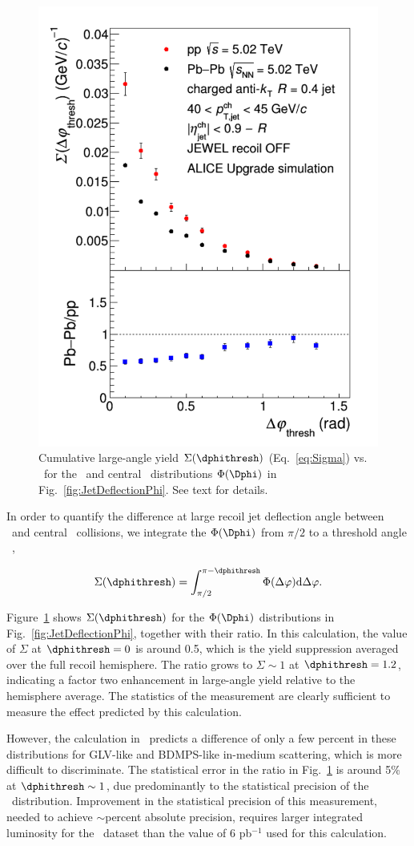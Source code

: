 \begin{figure}[tbh!]
\centering
\includegraphics[height=0.6\textwidth]{figures/jetdeflection/JetDeflectionFig_Sigma.pdf}
\caption{Cumulative large-angle yield $\Sigma(\dphithresh)$ (Eq.~\ref{eq:Sigma}) vs. \dphithresh\ for the \pp\ and central \PbPb\ distributions $\Phi(\Dphi)$ in Fig.~\ref{fig:JetDeflectionPhi}. See text for details. 
}
\label{fig:JetDeflectionSigma}
\end{figure}

In order to quantify the difference at large recoil jet deflection angle between \pp\ and central \PbPb\ collisions, we integrate the $\Phi(\Dphi)$ from $\pi/2$ to a threshold angle \dphithresh~\cite{Adam:2015doa},

\begin{equation}
\Sigma(\dphithresh) = 
\int_{\pi/2}^{\pi-\dphithresh}
\Phi(\Delta\varphi)\mathrm{d}\Delta\varphi.
\label{eq:Sigma}
\end{equation}

\noindent
Figure~\ref{fig:JetDeflectionSigma} shows $\Sigma(\dphithresh)$ for the $\Phi(\Dphi)$ distributions in Fig.~\ref{fig:JetDeflectionPhi}, together with their ratio. In this calculation, the value of $\Sigma$ at $\dphithresh=0$ is around 0.5, which is the yield suppression averaged over the full recoil hemisphere. The ratio grows to $\Sigma\sim1$ at $\dphithresh=1.2$, indicating a factor two enhancement in large-angle yield relative to the hemisphere average. The statistics of the measurement are clearly sufficient to measure the effect predicted by this calculation.

However, the calculation in~\cite{Gyulassy:2018qhr} predicts a difference of only a few percent in these distributions for GLV-like and BDMPS-like in-medium scattering, which is more difficult to discriminate. The statistical error in the ratio in Fig.~\ref{fig:JetDeflectionSigma} is around 5\% at $\dphithresh\sim1$, due predominantly to the statistical precision of the \pp\ distribution. Improvement in the statistical precision of this measurement, needed to achieve $\sim$percent absolute precision, requires larger integrated luminosity for the \pp\ dataset than the value of 6 pb$^{-1}$ used for this calculation.

